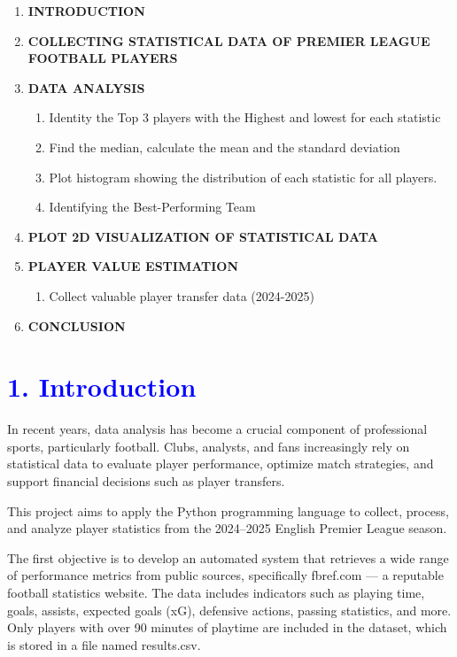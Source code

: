 \documentclass[a4paper,12pt]{article}
\begin{document}
\begin{enumerate}[label=\textbf{\arabic*.}, leftmargin=1.5cm]
    \item \textbf{INTRODUCTION}
    \item \textbf{COLLECTING STATISTICAL DATA OF PREMIER LEAGUE FOOTBALL PLAYERS}
    \item \textbf{DATA ANALYSIS}
    \begin{enumerate}[label=\arabic{enumi}.\arabic*.]
        \item Identity the Top 3 players with the Highest and lowest for each statistic
        \item  Find the median, calculate the mean and the standard deviation
        \item Plot histogram showing the distribution of each statistic for all players.
        \item Identifying the Best-Performing Team
    \end{enumerate}
    \item \textbf{PLOT 2D VISUALIZATION OF STATISTICAL DATA}
    \item \textbf{PLAYER VALUE ESTIMATION}
    \begin{enumerate}
    [label=\arabic{enumi}.\arabic*.]    \item Collect valuable player transfer data (2024-2025)
    \end{enumerate}
    \item \textbf{CONCLUSION}
\end{enumerate}

\newpage
\section*{\textcolor{blue}{\Large 1. Introduction}}

\setlength{\parindent}{0pt}  
\setlength{\parskip}{1em} 
In recent years, data analysis has become a crucial component of professional sports, particularly football. Clubs, analysts, and fans increasingly rely on statistical data to evaluate player performance, optimize match strategies, and support financial decisions such as player transfers.

This project aims to apply the Python programming language to collect, process, and analyze player statistics from the 2024–2025 English Premier League season.

The first objective is to develop an automated system that retrieves a wide range of performance metrics from public sources, specifically fbref.com — a reputable football statistics website. The data includes indicators such as playing time, goals, assists, expected goals (xG), defensive actions, passing statistics, and more. Only players with over 90 minutes of playtime are included in the dataset, which is stored in a file named results.csv.
\end{document}
